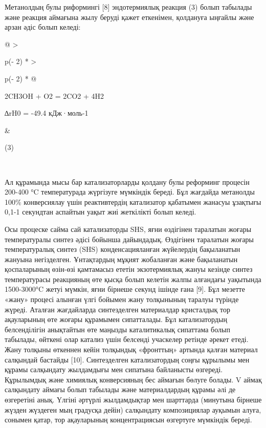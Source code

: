 Метанолдың булы риформингі {[}8{]} эндотермиялық реакция (3) болып
табылады және реакция аймағына жылу беруді қажет еткенімен, қолдануға
ыңғайлы және арзан әдіс болып келеді:

\begin{longtable}[]{@{}
  >{\raggedright\arraybackslash}p{(\columnwidth - 2\tabcolsep) * }
  >{\raggedright\arraybackslash}p{(\columnwidth - 2\tabcolsep) * }@{}}
\toprule\noalign{}
\begin{minipage}[b]{\linewidth}\raggedright
2CH3OH + O2 = 2CO2 + 4H2

∆rH0 = -49.4 кДж·моль-1
\end{minipage} & \begin{minipage}[b]{\linewidth}\raggedright
(3)
\end{minipage} \\
\midrule\noalign{}
\endhead
\bottomrule\noalign{}
\endlastfoot
\end{longtable}

Ал құрамында мысы бар катализаторларды қолдану булы реформинг процесін
200-400 °C температурада жүргізуге мүмкіндік береді. Бұл жағдайда
метанолды 100\% конверсиялау үшін реактивтердің катализатор қабатымен
жанасуы ұзақтығы 0,1-1 секундтан аспайтын уақыт жиі жеткілікті болып
келеді.

Осы процеске сайма сай катализаторды SHS, яғни өздігінен таралатын
жоғары температуралы синтез әдісі бойынша дайындадық. Өздігінен
таралатын жоғары температуралық синтез (SHS) конденсацияланған
жүйелердің бақыланатын жануына негізделген. Ұнтақтардың мұқият
жобаланған және бақыланатын қоспаларының өзін-өзі қамтамасыз ететін
экзотермиялық жануы кезінде синтез температурасы реакцияның өте қысқа
болып келетін жалпы алғандағы уақытында 1500-3000°C жетуі мүмкін, яғни
бірнеше секунд ішінде ғана {[}9{]}. Бұл мезетте «жану» процесі алынған
үлгі бойымен жану толқынының таралуы түрінде жүреді. Аталған жағдайларда
синтезделген материалдар кристалдық тор ақауларының өте жоғары құрамымен
сипатталады. Бұл катализатордың белсенділігін анықтайтын өте маңызды
каталитикалық сипаттама болып табылады, өйткені олар катализ үшін
белсенді учаскелер ретінде әрекет етеді. Жану толқыны өткеннен кейін
толқындық «фронттың» артында қалған материал салқындай бастайды
{[}10{]}. Синтезделген катализатордың соңғы құрылымы мен құрамы
салқындату жылдамдығы мен сипатына байланысты өзгереді. Құрылымдық және
химиялық конверсияның бес аймағын бөлуге болады. V аймақ салқындату
аймағы болып табылады және материалдардың құрамы әлі де өзгеретіні анық.
Үлгіні әртүрлі жылдамдықтар мен шарттарда (минутына бірнеше жүзден
жүздеген мың градусқа дейін) салқындату композициялар ауқымын алуға,
сонымен қатар, тор ақауларының концентрациясын өзгертуге мүмкіндік
береді.

